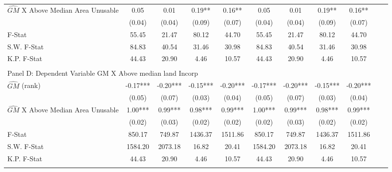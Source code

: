 \begin{table}[htbp]
\begin{threeparttable}
\begin{tabular}{l*{10}{c}}
\addlinespace
$\hat{GM}$ X Above Median Area Unusable&       0.05   &       0.01   &       0.19** &       0.16** &       0.05   &       0.01   &       0.19** &       0.16** \\
                &     (0.04)   &     (0.04)   &     (0.09)   &     (0.07)   &     (0.04)   &     (0.04)   &     (0.09)   &     (0.07)   \\
\midrule
F-Stat          &      55.45   &      21.47   &      80.12   &      44.70   &      55.45   &      21.47   &      80.12   &      44.70   \\
S.W. F-Stat     &      84.83   &      40.54   &      31.46   &      30.98   &      84.83   &      40.54   &      31.46   &      30.98   \\
K.P. F-Stat     &      44.43   &      20.90   &       4.46   &      10.57   &      44.43   &      20.90   &       4.46   &      10.57   \\
\cmidrule[\heavyrulewidth](lr){1-9} \\ \cmidrule[\heavyrulewidth](lr){1-9}
\multicolumn{8}{l}{Panel D: Dependent Variable GM X Above median land Incorp}\\
\cmidrule(lr){1-9}
$\hat{GM}$ (rank)&      -0.17***&      -0.20***&      -0.15***&      -0.20***&      -0.17***&      -0.20***&      -0.15***&      -0.20***\\
                &     (0.05)   &     (0.07)   &     (0.03)   &     (0.04)   &     (0.05)   &     (0.07)   &     (0.03)   &     (0.04)   \\
\addlinespace
$\hat{GM}$ X Above Median Area Unusable&       1.00***&       0.99***&       0.98***&       0.99***&       1.00***&       0.99***&       0.98***&       0.99***\\
                &     (0.02)   &     (0.03)   &     (0.02)   &     (0.02)   &     (0.02)   &     (0.03)   &     (0.02)   &     (0.02)   \\
\midrule
F-Stat          &     850.17   &     749.87   &    1436.37   &    1511.86   &     850.17   &     749.87   &    1436.37   &    1511.86   \\
S.W. F-Stat     &    1584.20   &    2073.18   &      16.82   &      20.41   &    1584.20   &    2073.18   &      16.82   &      20.41   \\
K.P. F-Stat     &      44.43   &      20.90   &       4.46   &      10.57   &      44.43   &      20.90   &       4.46   &      10.57   \\
\cmidrule[\heavyrulewidth](lr){1-9} \\ \cmidrule[\heavyrulewidth](lr){1-9}

\end{tabular}
\end{threeparttable}
\end{table}
